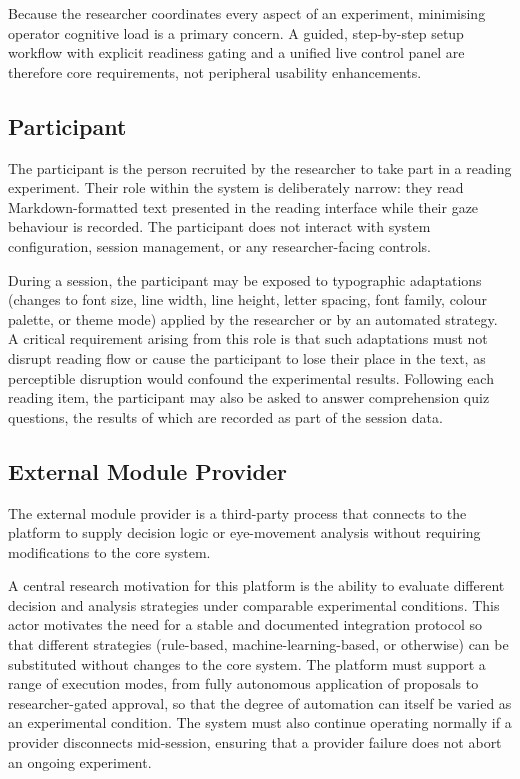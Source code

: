 Because the researcher coordinates every aspect of an experiment, minimising operator cognitive load is a primary concern.
A guided, step-by-step setup workflow with explicit readiness gating and a unified live control panel are therefore core requirements, not peripheral usability enhancements.

\subsection{Participant}
\label{sec:stakeholder-participant}

The participant is the person recruited by the researcher to take part in a reading experiment.
Their role within the system is deliberately narrow: they read Markdown-formatted text presented in the reading interface while their gaze behaviour is recorded.
The participant does not interact with system configuration, session management, or any researcher-facing controls.

During a session, the participant may be exposed to typographic adaptations (changes to font size, line width, line height, letter spacing, font family, colour palette, or theme mode) applied by the researcher or by an automated strategy.
A critical requirement arising from this role is that such adaptations must not disrupt reading flow or cause the participant to lose their place in the text, as perceptible disruption would confound the experimental results.
Following each reading item, the participant may also be asked to answer comprehension quiz questions, the results of which are recorded as part of the session data.

\subsection{External Module Provider}
\label{sec:stakeholder-provider}

The external module provider is a third-party process that connects to the platform to supply decision logic or eye-movement analysis without requiring modifications to the core system.

A central research motivation for this platform is the ability to evaluate different decision and analysis strategies under comparable experimental conditions.
This actor motivates the need for a stable and documented integration protocol so that different strategies (rule-based, machine-learning-based, or otherwise) can be substituted without changes to the core system.
The platform must support a range of execution modes, from fully autonomous application of proposals to researcher-gated approval, so that the degree of automation can itself be varied as an experimental condition.
The system must also continue operating normally if a provider disconnects mid-session, ensuring that a provider failure does not abort an ongoing experiment.

